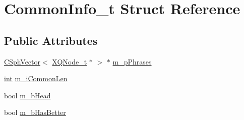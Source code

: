 \hypertarget{structCommonInfo__t}{\section{Common\-Info\-\_\-t Struct Reference}
\label{structCommonInfo__t}
}
\subsection*{Public Attributes}
\begin{DoxyCompactItemize}
\item 
\hyperlink{classCSphVector}{C\-Sph\-Vector}$<$ \hyperlink{structXQNode__t}{X\-Q\-Node\-\_\-t} $\ast$ $>$ $\ast$ \hyperlink{structCommonInfo__t_a59579ef0b59de6030ad2953fca3066f2}{m\-\_\-p\-Phrases}
\item 
\hyperlink{sphinxexpr_8cpp_a4a26e8f9cb8b736e0c4cbf4d16de985e}{int} \hyperlink{structCommonInfo__t_ab04e7c9b29ef5966442bfc7c93e3c17f}{m\-\_\-i\-Common\-Len}
\item 
bool \hyperlink{structCommonInfo__t_a3f0b92eb2f401f81170bf59770abccdf}{m\-\_\-b\-Head}
\item 
bool \hyperlink{structCommonInfo__t_aaefa7a1bca31561afa9edb9e0ea2bd8d}{m\-\_\-b\-Has\-Better}
\end{DoxyCompactItemize}



